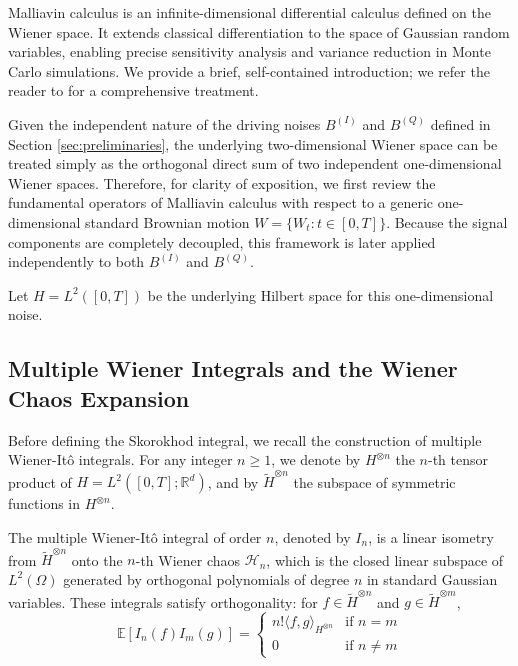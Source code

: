 \documentclass[11pt]{article}
\begin{document}
Malliavin calculus is an infinite-dimensional differential calculus defined on the Wiener space. It extends classical differentiation to the space of Gaussian random variables, enabling precise sensitivity analysis and variance reduction in Monte Carlo simulations. We provide a brief, self-contained introduction; we refer the reader to \citet{nualart2006malliavin} for a comprehensive treatment.

Given the independent nature of the driving noises $B^{(I)}$ and $B^{(Q)}$ defined in Section \ref{sec:preliminaries}, the underlying two-dimensional Wiener space can be treated simply as the orthogonal direct sum of two independent one-dimensional Wiener spaces. Therefore, for clarity of exposition, we first review the fundamental operators of Malliavin calculus with respect to a generic one-dimensional standard Brownian motion $W = \{W_t : t \in [0,T]\}$. Because the signal components are completely decoupled, this framework is later applied independently to both $B^{(I)}$ and $B^{(Q)}$. 

Let $H = L^2([0, T])$ be the underlying Hilbert space for this one-dimensional noise.

\subsection{Multiple Wiener Integrals and the Wiener Chaos Expansion}

Before defining the Skorokhod integral, we recall the construction of multiple Wiener-Itô integrals. For any integer $n \geq 1$, we denote by $H^{\otimes n}$ the $n$-th tensor product of $H = L^2([0,T]; \mathbb{R}^d)$, and by $\tilde{H}^{\otimes n}$ the subspace of symmetric functions in $H^{\otimes n}$.

The multiple Wiener-Itô integral of order $n$, denoted by $I_n$, is a linear isometry from $\tilde{H}^{\otimes n}$ onto the $n$-th Wiener chaos $\mathcal{H}_n$, which is the closed linear subspace of $L^2(\Omega)$ generated by orthogonal polynomials of degree $n$ in standard Gaussian variables. These integrals satisfy orthogonality: for $f \in \tilde{H}^{\otimes n}$ and $g \in \tilde{H}^{\otimes m}$,
\begin{equation}
    \mathbb{E}[I_n(f) I_m(g)] = 
    \begin{cases} 
    n! \langle f, g \rangle_{H^{\otimes n}} & \text{if } n = m \\ 
    0 & \text{if } n \neq m 
    \end{cases}
\end{equation}
\end{document}
